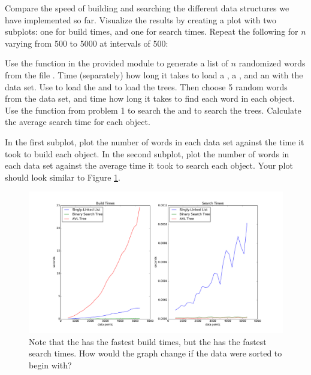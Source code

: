 \begin{problem}
Compare the speed of building and searching the different data structures we have implemented so far.
Visualize the results by creating a plot with two subplots: one for build times, and one for search times.
Repeat the following for $n$ varying from 500 to 5000 at intervals of 500:

Use the  function in the provided  module to generate a list of $n$ randomized words from the file .
Time (separately) how long it takes to load a , a , and an  with the data set.
Use  to load the  and  to load the trees.
Then choose 5 random words from the data set, and time how long it takes to find each word in each object.
Use the  function from problem 1 to search the  and  to search the trees.
Calculate the average search time for each object.

In the first subplot, plot the number of words in each data set against the time it took to build each object.
In the second subplot, plot the number of words in each data set against the average time it took to search each object.
Your plot should look similar to Figure \ref{fig:times}.

\begin{figure}[H]
\includegraphics[width=\textwidth]{times.pdf}
\caption{Note that the  has the fastest build times, but the  has the fastest search times. How would the graph change if the data were sorted to begin with?}
\label{fig:times}
\end{figure}

\end{problem}


